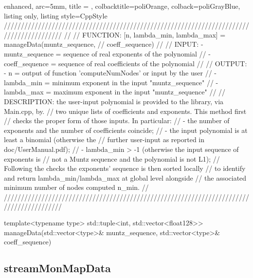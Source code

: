 \documentclass[a4paper, twosided]{book}
\begin{document}
\begin{tcblisting}{enhanced,
                   arc=5mm,
                   title = \color{black}{\large \ttfamily DatIo.cpp/manageData},
                   colbacktitle=poliOrange,
                   colback=poliGrayBlue,
                   listing only,
                   listing style=CppStyle}
/////////////////////////////////////////////////////////////////////////////////////////
//
//       FUNCTION: [n, {lambda_min, lambda_max}] = manageData(muntz_sequence, 
//                                                              coeff_sequence)
//                
//        INPUT: - muntz_sequence = sequence of real exponents of the polynomial
//               - coeff_sequence = sequence of real coefficients of the polynomial
//
//       OUTPUT: - n = output of function 'computeNumNodes' or input by the user
//               - lambda_min = minimum exponent in the input "muntz_sequence"
//               - lambda_max = maximum exponent in the input "muntz_sequence"
//
//    DESCRIPTION: the user-input polynomial is provided to the library, via Main.cpp, by.
//                 two unique lists of coefficients and exponents. This method first 
//                 checks the proper form of those inputs. In particular:
//                    - the number of exponents and the number of coefficients coincide;
//                    - the input polynomial is at least a binomial (otherwise the 
//                      further user-input as reported in doc/UserManual.pdf);
//                    - lambda_min > -1 (otherwise the input sequence of exponents is 
//                      not a Muntz sequence and the polynomial is not L1);
//                 Following the checks the exponents' sequence is then sorted locally
//                 to identify and return lambda_min/lambda_max at global level alongside
//                 the associated minimum number of nodes computed n_min.
//
/////////////////////////////////////////////////////////////////////////////////////////

template<typename type>
std::tuple<int, std::vector<float128>> manageData(std::vector<type>& muntz_sequence, std::vector<type>& coeff_sequence)
\end{tcblisting}

\subsection[streamMonMapData]{\changefont streamMonMapData}\label{SubSec4.2.2}
\end{document}
